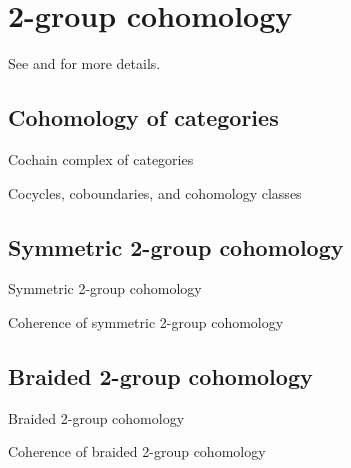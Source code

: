 \section{2-group cohomology}

See \cite{picard} and \cite{kkg} for more details.

\subsection{Cohomology of categories}

\begin{defn} Cochain complex of categories \end{defn}

\begin{defn} Cocycles, coboundaries, and cohomology classes \end{defn}

\subsection{Symmetric 2-group cohomology}

\begin{defn} Symmetric 2-group cohomology \end{defn}

\begin{prop} Coherence of symmetric 2-group cohomology \end{prop}

\subsection{Braided 2-group cohomology}

\begin{defn} Braided 2-group cohomology \end{defn}

\begin{prop} Coherence of braided 2-group cohomology \end{prop} 
 